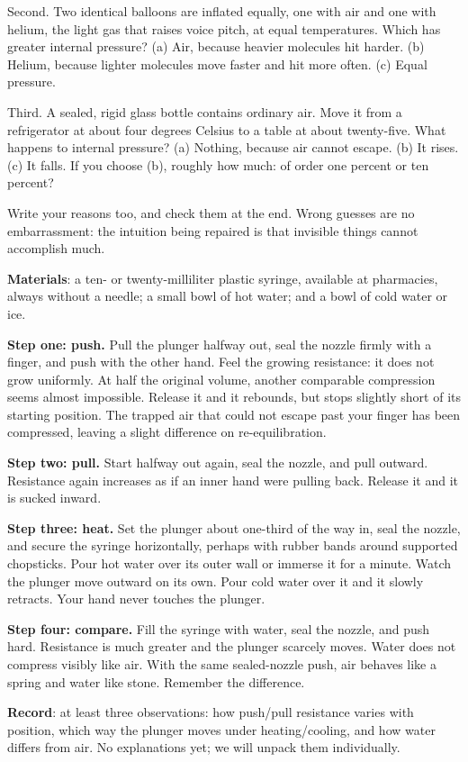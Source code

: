 Second. Two identical balloons are inflated equally, one with air and one with helium, the light gas that raises voice pitch, at equal temperatures. Which has greater internal pressure? (a) Air, because heavier molecules hit harder. (b) Helium, because lighter molecules move faster and hit more often. (c) Equal pressure.

Third. A sealed, rigid glass bottle contains ordinary air. Move it from a refrigerator at about four degrees Celsius to a table at about twenty-five. What happens to internal pressure? (a) Nothing, because air cannot escape. (b) It rises. (c) It falls. If you choose (b), roughly how much: of order one percent or ten percent?

Write your reasons too, and check them at the end. Wrong guesses are no embarrassment: the intuition being repaired is that invisible things cannot accomplish much.


\begin{experiment}
\textbf{Materials}: a ten- or twenty-milliliter plastic syringe, available at pharmacies, always without a needle; a small bowl of hot water; and a bowl of cold water or ice.

\textbf{Step one: push.} Pull the plunger halfway out, seal the nozzle firmly with a finger, and push with the other hand. Feel the growing resistance: it does not grow uniformly. At half the original volume, another comparable compression seems almost impossible. Release it and it rebounds, but stops slightly short of its starting position. The trapped air that could not escape past your finger has been compressed, leaving a slight difference on re-equilibration.

\textbf{Step two: pull.} Start halfway out again, seal the nozzle, and pull outward. Resistance again increases as if an inner hand were pulling back. Release it and it is sucked inward.

\textbf{Step three: heat.} Set the plunger about one-third of the way in, seal the nozzle, and secure the syringe horizontally, perhaps with rubber bands around supported chopsticks. Pour hot water over its outer wall or immerse it for a minute. Watch the plunger move outward on its own. Pour cold water over it and it slowly retracts. Your hand never touches the plunger.

\textbf{Step four: compare.} Fill the syringe with water, seal the nozzle, and push hard. Resistance is much greater and the plunger scarcely moves. Water does not compress visibly like air. With the same sealed-nozzle push, air behaves like a spring and water like stone. Remember the difference.

\textbf{Record}: at least three observations: how push/pull resistance varies with position, which way the plunger moves under heating/cooling, and how water differs from air. No explanations yet; we will unpack them individually.
\end{experiment}

